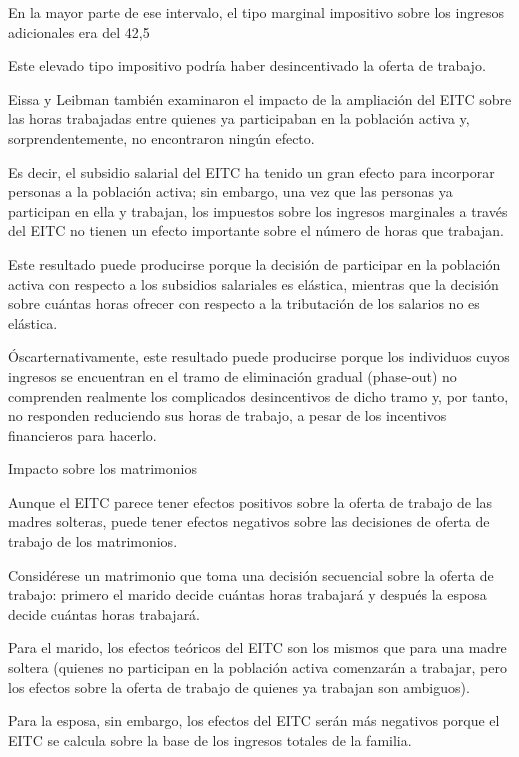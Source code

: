 \documentclass[10pt,a4paper]{article}
\begin{document}
En la mayor parte de ese intervalo, el tipo marginal impositivo sobre los ingresos adicionales era del 42,5 %

Este elevado tipo impositivo podría haber desincentivado la oferta de trabajo.

Eissa y Leibman también examinaron el impacto de la ampliación del EITC sobre las horas trabajadas entre quienes ya participaban en la población activa y, sorprendentemente, no encontraron ningún efecto.

Es decir, el subsidio salarial del EITC ha tenido un gran efecto para incorporar personas a la población activa; sin embargo, una vez que las personas ya participan en ella y trabajan, los impuestos sobre los ingresos marginales a través del EITC no tienen un efecto importante sobre el número de horas que trabajan.

Este resultado puede producirse porque la decisión de participar en la población activa con respecto a los subsidios salariales es elástica, mientras que la decisión sobre cuántas horas ofrecer con respecto a la tributación de los salarios no es elástica.

Óscarternativamente, este resultado puede producirse porque los individuos cuyos ingresos se encuentran en el tramo de eliminación gradual (phase-out) no comprenden realmente los complicados desincentivos de dicho tramo y, por tanto, no responden reduciendo sus horas de trabajo, a pesar de los incentivos financieros para hacerlo.

Impacto sobre los matrimonios

Aunque el EITC parece tener efectos positivos sobre la oferta de trabajo de las madres solteras, puede tener efectos negativos sobre las decisiones de oferta de trabajo de los matrimonios.

Considérese un matrimonio que toma una decisión secuencial sobre la oferta de trabajo: primero el marido decide cuántas horas trabajará y después la esposa decide cuántas horas trabajará.

Para el marido, los efectos teóricos del EITC son los mismos que para una madre soltera (quienes no participan en la población activa comenzarán a trabajar, pero los efectos sobre la oferta de trabajo de quienes ya trabajan son ambiguos).

Para la esposa, sin embargo, los efectos del EITC serán más negativos porque el EITC se calcula sobre la base de los ingresos totales de la familia.
\end{document}
